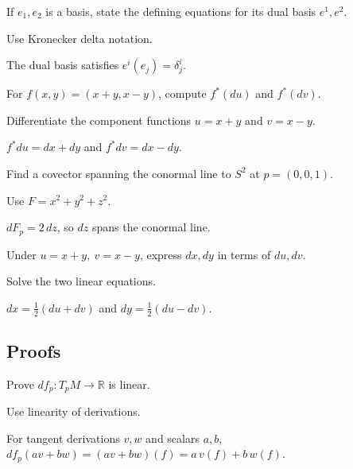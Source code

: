 \begin{exercise}\label{exr:vii05-ped-02}
If \(e_1,e_2\) is a basis, state the defining equations for its dual basis \(e^1,e^2\).
\end{exercise}
\begin{hint}
Use Kronecker delta notation.
\end{hint}
\begin{solution}
The dual basis satisfies \(e^i(e_j)=\delta^i_j\).
\end{solution}

\begin{exercise}\label{exr:vii05-ped-03}
For \(f(x,y)=(x+y,x-y)\), compute \(f^*(du)\) and \(f^*(dv)\).
\end{exercise}
\begin{hint}
Differentiate the component functions \(u=x+y\) and \(v=x-y\).
\end{hint}
\begin{solution}
\(f^*du=dx+dy\) and \(f^*dv=dx-dy\).
\end{solution}

\begin{exercise}\label{exr:vii05-ped-04}
Find a covector spanning the conormal line to \(S^2\) at \(p=(0,0,1)\).
\end{exercise}
\begin{hint}
Use \(F=x^2+y^2+z^2\).
\end{hint}
\begin{solution}
\(dF_p=2\,dz\), so \(dz\) spans the conormal line.
\end{solution}

\begin{exercise}\label{exr:vii05-ped-05}
Under \(u=x+y,\ v=x-y\), express \(dx,dy\) in terms of \(du,dv\).
\end{exercise}
\begin{hint}
Solve the two linear equations.
\end{hint}
\begin{solution}
\(dx=\tfrac12(du+dv)\) and \(dy=\tfrac12(du-dv)\).
\end{solution}

\subsection*{Proofs}

\begin{exercise}\label{exr:vii05-ped-06}
Prove \(df_p:T_pM\to\mathbb R\) is linear.
\end{exercise}
\begin{hint}
Use linearity of derivations.
\end{hint}
\begin{solution}
For tangent derivations \(v,w\) and scalars \(a,b\), \(df_p(av+bw)=(av+bw)(f)=a\,v(f)+b\,w(f)\).
\end{solution}

